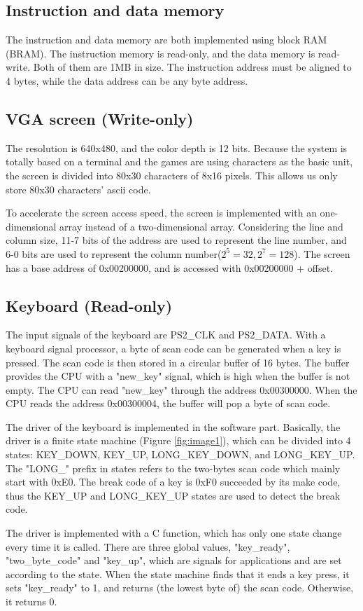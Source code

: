 \documentclass[
	a4paper, %
	11pt, %
]{CSUniSchoolLabReport}
\begin{document}
\subsection{Instruction and data memory}
The instruction and data memory are both implemented using block RAM (BRAM). The instruction memory is read-only, and the data memory is read-write. Both of them are 1MB in size. The instruction address must be aligned to 4 bytes, while the data address can be any byte address.
\subsection{VGA screen (Write-only)}
The resolution is 640x480, and the color depth is 12 bits. Because the system is totally based on a terminal and the games are using characters as the basic unit, the screen is divided into 80x30 characters of 8x16 pixels. This allows us only store 80x30 characters' ascii code.

To accelerate the screen access speed, the screen is implemented with an one-dimensional array instead of a two-dimensional array. Considering the line and column size, 11-7 bits of the address are used to represent the line number, and 6-0 bits are used to represent the column number($2^5=32,2^7=128$). The screen has a base address of 0x00200000, and is accessed with 0x00200000 + offset.
\subsection{Keyboard (Read-only)}
The input signals of the keyboard are PS2\_CLK and PS2\_DATA. With a keyboard signal processor, a byte of scan code can be generated when a key is pressed. The scan code is then stored in a circular buffer of 16 bytes. The buffer provides the CPU with a "new\_key" signal, which is high when the buffer is not empty. The CPU can read "new\_key" through the address 0x00300000. When the CPU reads the address 0x00300004, the buffer will pop a byte of scan code.

The driver of the keyboard is implemented in the software part. Basically, the driver is a finite state machine (Figure \ref{fig:image1}), which can be divided into 4 states: KEY\_DOWN, KEY\_UP, LONG\_KEY\_DOWN, and LONG\_KEY\_UP. The "LONG\_" prefix in states refers to the two-bytes scan code which mainly start with 0xE0. The break code of a key is 0xF0 succeeded by its make code, thus the KEY\_UP and LONG\_KEY\_UP states are used to detect the break code.

The driver is implemented with a C function, which has only one state change every time it is called. There are three global values, "key\_ready", "two\_byte\_code" and "key\_up", which are signals for applications and are set according to the state. When the state machine finds that it ends a key press, it sets "key\_ready" to 1, and returns (the lowest byte of) the scan code. Otherwise, it returns 0.
\end{document}
